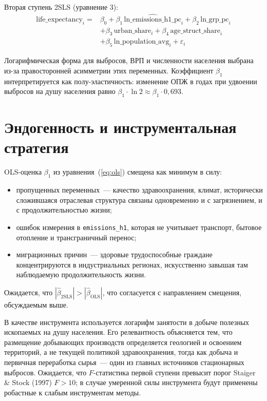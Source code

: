 \documentclass[10pt,a4paper]{article}
\begin{document}
Вторая ступень 2SLS (уравнение 3):
\begin{equation}
\label{eq:ss}
\begin{aligned}
\text{life\_expectancy}_i = {} & \beta_0 + \beta_1\,\widehat{\text{ln\_emissions\_h1\_pc}}_i + \beta_2\,\text{ln\_grp\_pc}_i \\
& + \beta_3\,\text{urban\_share}_i + \beta_4\,\text{age\_struct\_share}_i \\
& + \beta_5\,\text{ln\_population\_avg}_i + \varepsilon_i
\end{aligned}
\end{equation}

Логарифмическая форма для выбросов, ВРП и численности населения выбрана из-за правосторонней асимметрии этих переменных. Коэффициент $\beta_1$ интерпретируется как полу-эластичность: изменение ОПЖ в годах при удвоении выбросов на душу населения равно $\beta_1\cdot\ln 2 \approx \beta_1\cdot 0{,}693$.

\section*{Эндогенность и инструментальная стратегия}

OLS-оценка $\beta_1$ из уравнения~(\ref{eq:ols}) смещена как минимум в силу:
\begin{itemize}
  \item пропущенных переменных~--- качество здравоохранения, климат, исторически сложившаяся отраслевая структура связаны одновременно и с загрязнением, и с продолжительностью жизни;
  \item ошибок измерения в \texttt{emissions\_h1}, которая не учитывает транспорт, бытовое отопление и трансграничный перенос;
  \item миграционных причин~--- здоровые трудоспособные граждане концентрируются в индустриальных регионах, искусственно завышая там наблюдаемую продолжительность жизни.
\end{itemize}

Ожидается, что $|\hat\beta_{\text{2SLS}}| > |\hat\beta_{\text{OLS}}|$, что согласуется с направлением смещения, обсуждаемым выше.

В качестве инструмента используется логарифм занятости в добыче полезных ископаемых на душу населения. Его релевантность объясняется тем, что размещение добывающих производств определяется геологией и освоением территорий, а не текущей политикой здравоохранения, тогда как добыча и первичная переработка сырья~--- один из главных источников стационарных выбросов. Ожидается, что $F$-статистика первой ступени превысит порог Staiger \& Stock (1997) $F > 10$; в случае умеренной силы инструмента будут применены робастные к слабым инструментам методы.
\end{document}
